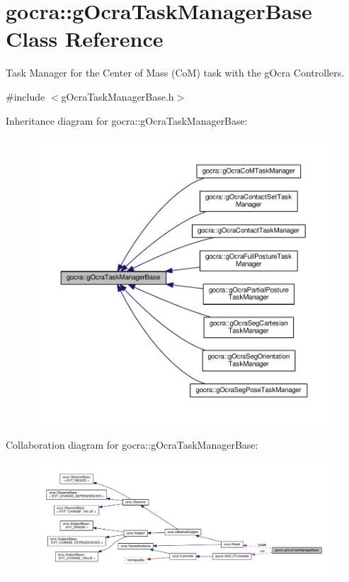 \hypertarget{classgocra_1_1gOcraTaskManagerBase}{}\section{gocra\+:\+:g\+Ocra\+Task\+Manager\+Base Class Reference}
\label{classgocra_1_1gOcraTaskManagerBase}


Task Manager for the Center of Mass (CoM) task with the g\+Ocra Controllers.  




{\ttfamily \#include $<$g\+Ocra\+Task\+Manager\+Base.\+h$>$}



Inheritance diagram for gocra\+:\+:g\+Ocra\+Task\+Manager\+Base\+:
\nopagebreak
\begin{figure}[H]
\begin{center}
\leavevmode
\includegraphics[width=350pt]{da/dd1/classgocra_1_1gOcraTaskManagerBase__inherit__graph}
\end{center}
\end{figure}


Collaboration diagram for gocra\+:\+:g\+Ocra\+Task\+Manager\+Base\+:
\nopagebreak
\begin{figure}[H]
\begin{center}
\leavevmode
\includegraphics[width=350pt]{da/d7b/classgocra_1_1gOcraTaskManagerBase__coll__graph}
\end{center}
\end{figure}
